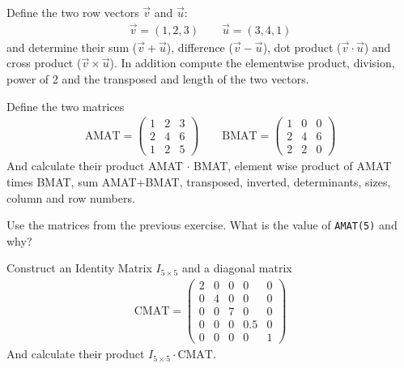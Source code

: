 \begin{ex}
Define the two row vectors $\vec{v}$ and $\vec{u}$:
\begin{align*}
\vec{v} = (1, 2, 3) \qquad \vec{u} = (3, 4, 1)
\end{align*}
and determine their 
sum ($\vec{v} + \vec{u}$),
difference ($\vec{v} - \vec{u}$),
dot product ($\vec{v} \cdot \vec{u}$) and
cross product ($\vec{v} \times \vec{u}$).
In addition compute the elementwise product, division, power of 2 and 
the transposed and length of the two vectors.
\end{ex}


\begin{ex}
Define the two matrices
\begin{align*}
\textrm{AMAT} = \begin{pmatrix}
1 &2 &3	\\
2 &4 &6	\\
1 &2 &5
\end{pmatrix}
\qquad
\textrm{BMAT} =
\begin{pmatrix}
1 &0 &0	\\
2 &4 &6	\\
2 &2 &0
\end{pmatrix}
\end{align*}
And calculate their product AMAT $\cdot$ BMAT, element wise product of AMAT times BMAT, sum
AMAT+BMAT, transposed, inverted, determinants, sizes, column and row numbers.
\end{ex}


\begin{ex}
Use the matrices from the previous exercise. What is the value of \verb!AMAT(5)! and why?
\end{ex}


\begin{ex}
Construct an Identity Matrix $I_{5\times5}$ and a diagonal matrix
\begin{align*}
\textrm{CMAT} = \begin{pmatrix}
2 &0 &0 &0 &0	\\
0 &4 &0 &0 &0	\\
0 &0 &7 &0 &0	\\
0 &0 &0 &0.5 &0	\\
0 &0 &0 &0 &1	
\end{pmatrix}
\end{align*}
And calculate their product $I_{5 \times 5} \cdot \textrm{CMAT}$.
\end{ex}



